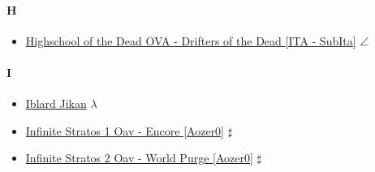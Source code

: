 		\paragraph{H} \hypertarget{OH}{}
			\begin{itemize}
				
				\item \href{https://mega.nz/#!Nz53EToA!UJz9JyQpNYJIhGBp0zBqUnQ727mF1tm9VgC5APiIktI} {Highschool of the Dead OVA - Drifters of the Dead [ITA - SubIta]}   $\angle$  \\ 
				
			\end{itemize}
		
		\paragraph{I} \hypertarget{OI}{}
			\begin{itemize}
				\item \href{https://mega.nz/#!X8JWRQqY!uN64hLpm8NdSrxsfWNaWCYXRDhl_OX3KPJJHcAvZCqw} {Iblard Jikan}   $\lambda$  \\ 
				\item \href{https://mega.nz/#F!FiIDXSzB!bua7LsPSDpDG0ztRSeAcvw} {Infinite Stratos 1 Oav - Encore [Aozer0]}   $\sharp$  \\
				\item \href{https://mega.nz/#F!V3JS2RjZ!91TqhuPfsU2jMucalsbueA} {Infinite Stratos 2 Oav - World Purge [Aozer0]}   $\sharp$  \\
			\end{itemize}
		
		
